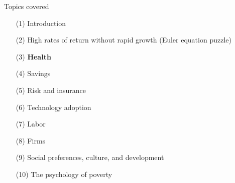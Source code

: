 \documentclass[aspectratio=169, 10pt, handout]{beamer}
\begin{document}
\begin{frame}{Topics covered}

\small 

\begin{enumerate}[(1)]

	\item[(1)] Introduction 
	
	\item[(2)] {High rates of return without rapid growth (Euler equation puzzle)}

	\item[(3)] \textbf{Health}

	
	\item[(4)] Savings
	
	\item[(5)] Risk and insurance

	\item[(6)] Technology adoption
	
	\item[(7)] Labor

	\item[(8)] Firms
	
	\item[(9)] Social preferences, culture, and development
	
	\item[(10)] The psychology of poverty

\end{enumerate}

\end{frame}
\end{document}
